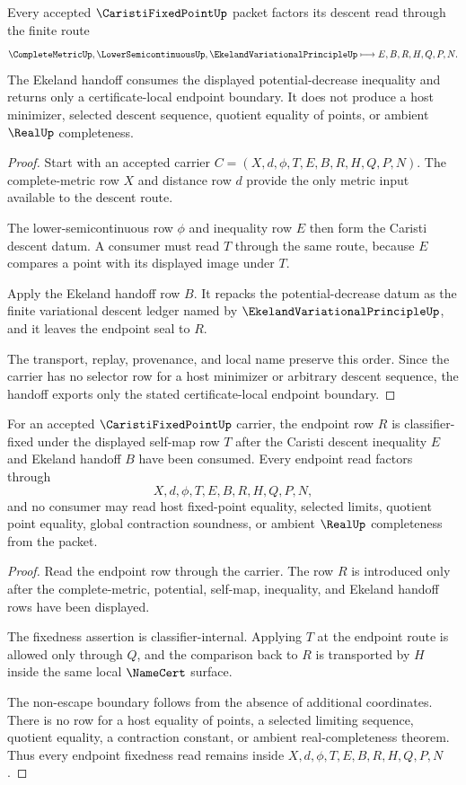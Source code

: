 \begin{theorem}
\label{thm:caristi-fixed-point-ekeland-handoff}
Every accepted $\CaristiFixedPointUp$ packet factors its descent read through the finite route
$$
\CompleteMetricUp,\LowerSemicontinuousUp,\EkelandVariationalPrincipleUp
\longmapsto
E,B,R,H,Q,P,N .
$$
The Ekeland handoff consumes the displayed potential-decrease inequality and returns only a certificate-local endpoint boundary. It does not produce a host minimizer, selected descent sequence, quotient equality of points, or ambient $\RealUp$ completeness.
\end{theorem}
\begin{proof}
Start with an accepted carrier $C=(X,d,\phi,T,E,B,R,H,Q,P,N)$. The complete-metric row $X$ and distance row $d$ provide the only metric input available to the descent route.

The lower-semicontinuous row $\phi$ and inequality row $E$ then form the Caristi descent datum. A consumer must read $T$ through the same route, because $E$ compares a point with its displayed image under $T$.

Apply the Ekeland handoff row $B$. It repacks the potential-decrease datum as the finite variational descent ledger named by $\EkelandVariationalPrincipleUp$, and it leaves the endpoint seal to $R$.

The transport, replay, provenance, and local name preserve this order. Since the carrier has no selector row for a host minimizer or arbitrary descent sequence, the handoff exports only the stated certificate-local endpoint boundary.
\end{proof}

\begin{theorem}
\label{thm:caristi-fixed-point-endpoint-fixedness-nonescape}
For an accepted $\CaristiFixedPointUp$ carrier, the endpoint row $R$ is classifier-fixed under the displayed self-map row $T$ after the Caristi descent inequality $E$ and Ekeland handoff $B$ have been consumed. Every endpoint read factors through
$$
X,d,\phi,T,E,B,R,H,Q,P,N,
$$
and no consumer may read host fixed-point equality, selected limits, quotient point equality, global contraction soundness, or ambient $\RealUp$ completeness from the packet.
\end{theorem}
\begin{proof}
Read the endpoint row through the carrier. The row $R$ is introduced only after the complete-metric, potential, self-map, inequality, and Ekeland handoff rows have been displayed.

The fixedness assertion is classifier-internal. Applying $T$ at the endpoint route is allowed only through $Q$, and the comparison back to $R$ is transported by $H$ inside the same local $\NameCert$ surface.

The non-escape boundary follows from the absence of additional coordinates. There is no row for a host equality of points, a selected limiting sequence, quotient equality, a contraction constant, or ambient real-completeness theorem. Thus every endpoint fixedness read remains inside $X,d,\phi,T,E,B,R,H,Q,P,N$.
\end{proof}

